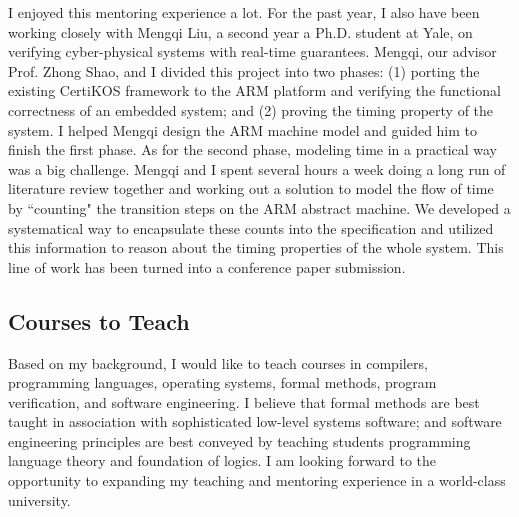 \documentclass[a4paper, 10pt]{article}
\begin{document}
\begin{small}
I enjoyed this mentoring experience a lot. For the past year, I also have been working closely with
Mengqi Liu, a second year a Ph.D. student at Yale,  on verifying cyber-physical systems with real-time guarantees. Mengqi, our advisor Prof. Zhong Shao, and I divided this project into two phases: (1) porting the existing CertiKOS framework to the ARM platform and verifying the functional correctness of an embedded system; and (2) proving the timing property of the system. I helped Mengqi design the  ARM machine model and guided him to finish the first phase. As for the second phase, modeling time in a practical way was a big challenge. 
Mengqi and I spent several hours a week doing a long run of literature review together and working out a solution to model the flow of time by ``counting" the transition steps on the ARM abstract machine.
We developed a systematical way to  encapsulate these counts into the specification and utilized this information to  reason about the timing properties of the whole system. This line of work has been turned into a conference paper submission.


\subsection*{Courses to Teach}
Based on my background, I would like to teach courses in
compilers,  programming languages, operating systems,
formal methods, program verification, and software engineering.
I believe that formal methods are best taught in association with sophisticated low-level systems software; and software engineering principles are best conveyed by teaching students programming language theory and foundation of logics.
I am looking forward to the opportunity to expanding 
my teaching and mentoring experience in a world-class university.
\end{small}
\end{document}
